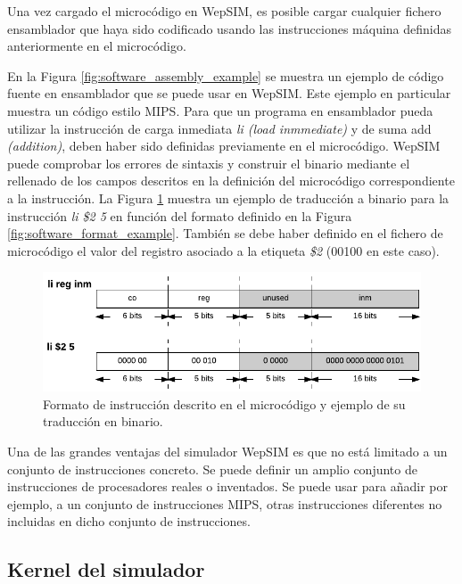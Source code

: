 Una vez cargado el microcódigo en WepSIM, es posible cargar cualquier fichero ensamblador que haya sido codificado usando las instrucciones  máquina definidas anteriormente en el microcódigo.

En la Figura \ref{fig:software_assembly_example} se muestra un ejemplo de código fuente en ensamblador que se puede usar en WepSIM. Este ejemplo en particular muestra un código estilo MIPS. Para que un programa en ensamblador pueda utilizar la instrucción de carga inmediata \emph{li (load inmmediate)} y de suma add \emph{(addition)}, deben haber sido definidas previamente en el microcódigo. WepSIM puede comprobar los errores de sintaxis y construir el binario mediante el rellenado de los campos descritos en la definición del microcódigo correspondiente a la instrucción. La Figura \ref{fig:software_assembly_traduction} muestra un ejemplo de traducción a binario para la instrucción \emph{li \$2 5} en función del formato definido en la Figura \ref{fig:software_format_example}. También se debe haber definido en el fichero de microcódigo el valor del registro asociado a la etiqueta \emph{\$2} (00100 en este caso).

\begin{figure}[htbp]
 	\centering
 	\includegraphics[width=14cm]{figures/instruction_example_traduction}
 	\caption{Formato de instrucción descrito en el microcódigo y ejemplo de su traducción en binario.}
	\label{fig:software_assembly_traduction}
\end{figure}

Una de las grandes ventajas del simulador WepSIM es que no está limitado a un conjunto de instrucciones concreto. Se puede definir un amplio conjunto de instrucciones de procesadores reales o inventados. Se puede usar para añadir por ejemplo, a un conjunto de instrucciones MIPS, otras instrucciones diferentes no incluidas en dicho conjunto de instrucciones.

\subsection{Kernel del simulador}
\label{sec:kernel_simulator}


